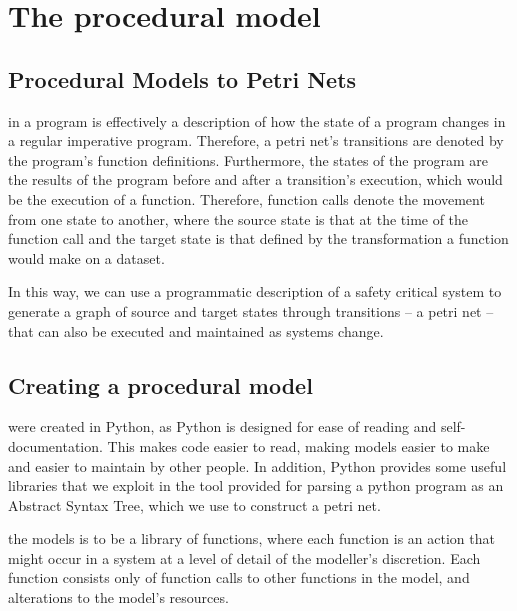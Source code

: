 \documentclass{tufte-handout}
\begin{document}
\newpage
\section{The procedural model}
\subsection{Procedural Models to Petri Nets}
in a program is effectively a description of how the state of a program changes in a regular imperative program. Therefore, a petri net's transitions are denoted by the program's function definitions. Furthermore, the states of the program are the results of the program before and after a transition's execution, which would be the execution of a function. Therefore, function calls denote the movement from one state to another, where the source state is that at the time of the function call and the target state is that defined by the transformation a function would make on a dataset. \par
In this way, we can use a programmatic description of a safety critical system to generate a graph of source and target states through transitions -- a petri net -- that can also be executed and maintained as systems change. \par

\subsection{Creating a procedural model}
were created in Python, as Python is designed for ease of reading and self-documentation. This makes code easier to read, making models easier to make and easier to maintain by other people. In addition, Python provides some useful libraries that we exploit in the tool provided for parsing a python program as an Abstract Syntax Tree, which we use to construct a petri net. \par
{}the models is to be a library of functions, where each function is an action that might occur in a system at a level of detail of the modeller's discretion. Each function consists only of function calls to other functions in the model, and alterations to the model's resources. 
\end{document}
